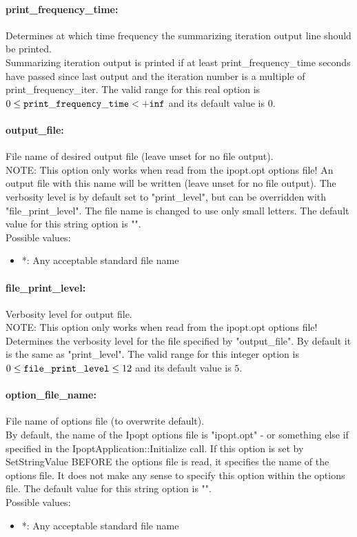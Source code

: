 \paragraph{print\_frequency\_time:}\label{opt:print_frequency_time} Determines at which time frequency the summarizing iteration output line should be printed. \\
 Summarizing iteration output is printed if at least print\_frequency\_time seconds have passed since last output and the iteration number is a multiple of print\_frequency\_iter. The valid range for this real option is 
$0 \le {\tt print\_frequency\_time } <  {\tt +inf}$
and its default value is $0$.


\paragraph{output\_file:}\label{opt:output_file} File name of desired output file (leave unset for no file output). \\
 NOTE: This option only works when read from the ipopt.opt options file! An output file with this name will be written (leave unset for no file output).  The verbosity level is by default set to "print\_level", but can be overridden with "file\_print\_level".  The file name is changed to use only small letters. The default value for this string option is "".
\\ 
Possible values:
\begin{itemize}
   \item *: Any acceptable standard file name
\end{itemize}

\paragraph{file\_print\_level:}\label{opt:file_print_level} Verbosity level for output file. \\
 NOTE: This option only works when read from the ipopt.opt options file! Determines the verbosity level for the file specified by "output\_file".  By default it is the same as "print\_level". The valid range for this integer option is
$0 \le {\tt file\_print\_level } \le 12$
and its default value is $5$.


\paragraph{option\_file\_name:}\label{opt:option_file_name} File name of options file (to overwrite default). \\
 By default, the name of the Ipopt options file is "ipopt.opt" - or something else if specified in the IpoptApplication::Initialize call. If this option is set by SetStringValue BEFORE the options file is read, it specifies the name of the options file.  It does not make any sense to specify this option within the options file. The default value for this string option is "".
\\ 
Possible values:
\begin{itemize}
   \item *: Any acceptable standard file name
\end{itemize}

